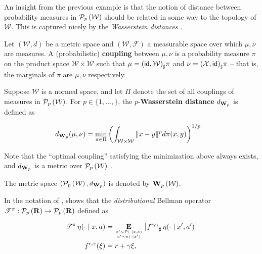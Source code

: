 An insight from the previous example is that the notion of distance
between probability measures in $\probset{\mathcal{W}}$ should be
related in some way to the topology of $\mathcal{W}$. This is captured
nicely by the \emph{Wasserstein distances} \citep{villani2008optimal}.

\begin{definition}\label{def:wasserstein}
  Let $(\mathcal{W}, d)$ be a metric space and $(\mathcal{W},
  \mathcal{F})$ a measurable space over which $\mu,\nu$ are
  measures. A (probabilistic) \textbf{coupling} between $\mu,\nu$ is a
  probability measure $\pi$ on the product space
  $\mathcal{W}\times\mathcal{W}$ such that $\mu =
  \pushforward{(\identity, \mathcal{W})}{\pi}$ and
  $\nu=\pushforward{(\mathcal{X}, \identity)}{\pi}$ -- that is, the
  marginals of $\pi$ are $\mu,\nu$ respectively.

  Suppose $\mathcal{W}$ is a normed space, and let $\Pi$ denote the
  set of all couplings of measures in $\probset{\mathcal{W}}$. For $p\in\{1,\dots,\}$, the
  $p$-\textbf{Wasserstein distance} $\wassermetric[p]$ is defined as

  \begin{align*}
    \wassermetric[p](\mu,\nu) &=
                                \min_{\pi\in\Pi}\left(\int_{\mathcal{W}\times\mathcal{W}}\|x
                                - y\|^pd\pi(x, y)\right)^{1/p}
  \end{align*}

  Note that the ``optimal coupling'' satisfying the minimization above
  always exists, and $\wassermetric[p]$ is a metric over
  $\probset{\mathcal{W}}$ \citep{villani2008optimal}. 

  The metric space $(\probset{\mathcal{W}}, \wassermetric[p])$ is denoted by
  $\wassersteinspace[p]{\mathcal{W}}$.
\end{definition}

In the notation of \citet{Rowland48495}, \citet{Bellemare2017ADP}
shows that the \emph{distributional} Bellman operator
$\bellmanoperator:\probset{\mathbf{R}}\to\probset{\mathbf{R}}$
defined as

\begin{align*}
  \bellmanoperator\returnmeasure(\cdot\mid x, a) &=
                                                       \Expectation{x'\sim
                                                       P(\cdot\mid x,
                                                       a)\atop
                                                       a'\sim\pi(\cdot\mid
                                                       x')}{\pushforward{f^{r,
                                                       \gamma}}{\returnmeasure(\cdot\mid
                                                       x', a')}}\\
  f^{r, \gamma}(\xi) &= r + \gamma\xi,
\end{align*}

